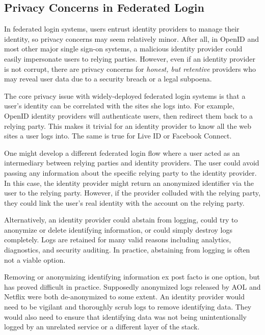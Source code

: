 \documentclass{llncs}
\begin{document}
\subsection{Privacy Concerns in Federated Login}

In federated login systems, users entrust identity providers to manage
their identity, so privacy concerns may seem relatively minor. After
all, in OpenID and most other major single sign-on systems, a
malicious identity provider could easily impersonate users to relying
parties. However, even if an identity provider is not corrupt, there
are privacy concerns for \emph{honest, but retentive} providers who
may reveal user data due to a security breach or a legal subpoena.

The core privacy issue with widely-deployed federated login systems is
that a user's identity can be correlated with the sites she logs
into. For example, OpenID identity providers will authenticate users,
then redirect them back to a relying party. This makes it trivial for
an identity provider to know all the web sites a user logs into. The
same is true for Live ID or Facebook Connect.

One might develop a different federated login flow where a user acted
as an intermediary between relying parties and identity providers. The
user could avoid passing any information about the specific relying
party to the identity provider. In this case, the identity provider
might return an anonymized identifier via the user to the relying
party. However, if the provider colluded with the relying party, they
could link the user's real identity with the account on the relying
party.

Alternatively, an identity provider could abstain from logging, could
try to anonymize or delete identifying information, or could simply
destroy logs completely. Logs are retained for many valid reasons
including analytics, diagnostics, and security auditing. In practice,
abstaining from logging is often not a viable option.

Removing or anonymizing identifying information ex post facto is one
option, but has proved difficult in practice. Supposedly anonymized
logs released by AOL \cite{BarZel06} and Netflix \cite{NaSh08} were
both de-anonymized to some extent. An identity provider would need to
be vigilant and thoroughly scrub logs to remove identifying data. They
would also need to ensure that identifying data was not being
unintentionally logged by an unrelated service or a different layer of
the stack.
\end{document}
